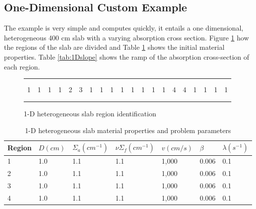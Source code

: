 \documentclass[12pt]{article}
\begin{document}
\subsection{One-Dimensional Custom Example}

The example is very simple and computes quickly, it entails a one dimensional, heterogeneous 400 cm slab with a varying absorption cross section.   Figure \ref{fig:slab} how the regions of the slab are divided and Table \ref{tab:1Dmat} shows the initial material properties.  Table \ref{tab:1Dslope} shows the ramp of the absorption cross-section of each region.

\begin{figure}[!htbp]
\begin{center}
\begin{tabular}{| l | l | l | l | l | l | l | l | l | l | l | l | l | l | l | l | l | l | l | l |}
\hline \hline \hline
  &   &   &   &   &   &    &    &   &   &   &   &   &   &   &   &   &   &   &   \\
  &   &   &   &   &   &    &    &   &   &   &   &   &   &   &   &   &   &   &   \\
1 & 1 & 1 & 1 & 2 & 3 & 1 & 1 & 1 & 1 & 1 & 1 & 1 & 1 & 4 & 4 & 1 & 1 & 1 & 1 \\
  &   &   &   &   &   &    &    &   &   &   &   &   &   &   &   &   &   &   &   \\
  &   &   &   &   &   &    &    &   &   &   &   &   &   &   &   &   &   &   &   \\
\hline \hline \hline
\end{tabular}
\caption{1-D heterogeneous slab region identification}
\label{fig:slab}
\end{center}
\end{figure}

\begin{table}[!htbp]
\begin{center}
\begin{tabular}{lllllll}
\toprule
Region & $D (cm)$ & $\Sigma_a (cm^{-1})$ & $\nu \Sigma_f (cm^{-1})$ & $v (cm/s)$ & $\beta$ & $\lambda (s^{-1})$ \\
\midrule
1 & 1.0 & 1.1 & 1.1 & 1,000 & 0.006 & 0.1 \\
2 & 1.0 & 1.1 & 1.1 & 1,000 & 0.006 & 0.1 \\
3 & 1.0 & 1.1 & 1.1 & 1,000 & 0.006 & 0.1 \\
4 & 1.0 & 1.1 & 1.1 & 1,000 & 0.006 & 0.1 \\
\bottomrule
\end{tabular}
\end{center}
\caption{1-D heterogeneous slab material properties and problem parameters}
\label{tab:1Dmat}
\end{table}
\end{document}
